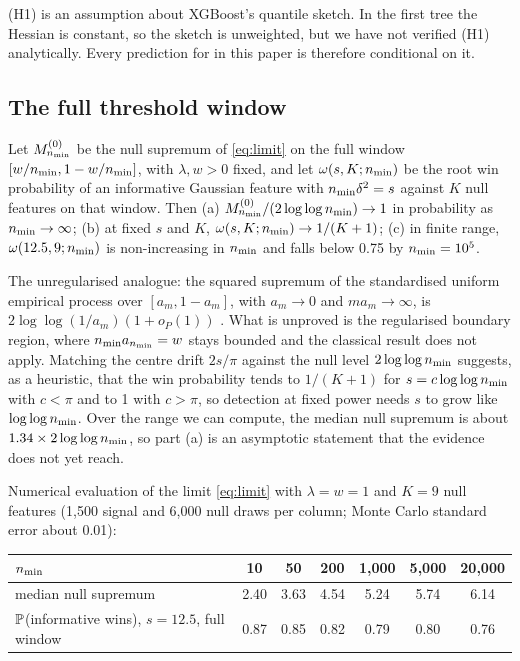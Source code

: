 (H1) is an assumption about XGBoost's quantile sketch. In the first tree the Hessian is constant, so the sketch is unweighted, but we have not verified (H1) analytically. Every prediction for  in this paper is therefore conditional on it.

\subsection{The full threshold window}\label{app:conj1}

\begin{conjecture}\label{conj:drift}
Let $M^{(0)}_{\nmin}$ be the null supremum of \eqref{eq:limit} on the full window $[w/\nmin, 1-w/\nmin]$, with $\lambda, w > 0$ fixed, and let $\omega(s,K;\nmin)$ be the root win probability of an informative Gaussian feature with $\nmin\delta^2 = s$ against $K$ null features on that window. Then (a) $M^{(0)}_{\nmin}/(2\log\log\nmin) \to 1$ in probability as $\nmin\to\infty$; (b) at fixed $s$ and $K$, $\omega(s,K;\nmin) \to 1/(K+1)$; (c) in finite range, $\omega(12.5, 9;\nmin)$ is non-increasing in $\nmin$ and falls below 0.75 by $\nmin = 10^5$.
\end{conjecture}

The unregularised analogue: the squared supremum of the standardised uniform empirical process over $[a_m, 1-a_m]$, with $a_m \to 0$ and $m a_m \to \infty$, is $2\log\log(1/a_m)(1 + o_P(1))$ \citep{jaeschke1979asymptotic,csorgo1993weighted}. What is unproved is the regularised boundary region, where $\nmin a_{\nmin} = w$ stays bounded and the classical result does not apply. Matching the centre drift $2s/\pi$ against the null level $2\log\log\nmin$ suggests, as a heuristic, that the win probability tends to $1/(K+1)$ for $s = c\log\log\nmin$ with $c < \pi$ and to 1 with $c > \pi$, so detection at fixed power needs $s$ to grow like $\log\log\nmin$. Over the range we can compute, the median null supremum is about $1.34\times 2\log\log\nmin$, so part (a) is an asymptotic statement that the evidence does not yet reach.


Numerical evaluation of the limit \eqref{eq:limit} with $\lambda = w = 1$ and $K = 9$ null features (1{,}500 signal and 6{,}000 null draws per column; Monte Carlo standard error about 0.01):

\begin{center}\small
\begin{tabular}{lcccccc}
\toprule
$\nmin$ & 10 & 50 & 200 & 1{,}000 & 5{,}000 & 20{,}000\\
\midrule
median null supremum & 2.40 & 3.63 & 4.54 & 5.24 & 5.74 & 6.14\\
$\P$(informative wins), $s = 12.5$, full window & 0.87 & 0.85 & 0.82 & 0.79 & 0.80 & 0.76\\
\bottomrule
\end{tabular}
\end{center}

